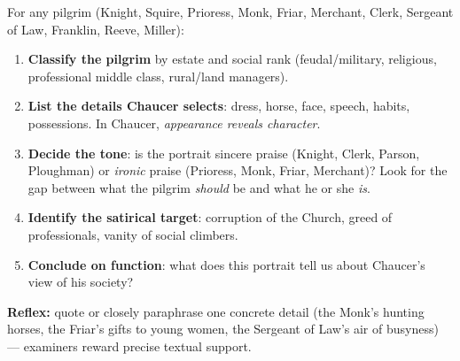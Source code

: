 \documentclass[11pt]{article}
\begin{document}
\begin{methode}
For any pilgrim (Knight, Squire, Prioress, Monk, Friar, Merchant, Clerk, Sergeant of Law, Franklin, Reeve, Miller):
\begin{enumerate}
\item \textbf{Classify the pilgrim} by estate and social rank (feudal/military, religious, professional middle class, rural/land managers).
\item \textbf{List the details Chaucer selects}: dress, horse, face, speech, habits, possessions. In Chaucer, \emph{appearance reveals character}.
\item \textbf{Decide the tone}: is the portrait sincere praise (Knight, Clerk, Parson, Ploughman) or \emph{ironic} praise (Prioress, Monk, Friar, Merchant)? Look for the gap between what the pilgrim \emph{should} be and what he or she \emph{is}.
\item \textbf{Identify the satirical target}: corruption of the Church, greed of professionals, vanity of social climbers.
\item \textbf{Conclude on function}: what does this portrait tell us about Chaucer's view of his society?
\end{enumerate}
\textbf{Reflex:} quote or closely paraphrase one concrete detail (the Monk's hunting horses, the Friar's gifts to young women, the Sergeant of Law's air of busyness) — examiners reward precise textual support.
\end{methode}
\end{document}
